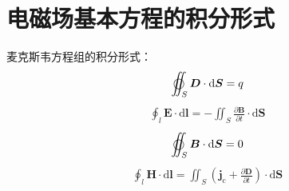 \documentclass[12pt, a4paper, twoside]{ctexbook}
\begin{document}
\section{电磁场基本方程的积分形式}
{\sonti 麦克斯韦方程组的积分形式}：
\begin{eqnarray}
    \varoiint_S\boldsymbol{D}\cdot\mathrm{d}\boldsymbol{S}=q
\end{eqnarray}
\begin{eqnarray}
    \oint_l\boldsymbol{E}\cdot\mathrm{d}\boldsymbol{l}=-\iint_S\frac{\partial \boldsymbol{B}}{\partial t}\cdot\mathrm{d}\boldsymbol{S}
\end{eqnarray}
\begin{eqnarray}
    \varoiint_S\boldsymbol{B}\cdot\mathrm{d}\boldsymbol{S}=0
\end{eqnarray}
\begin{eqnarray}
    \oint_l \boldsymbol{H}\cdot\mathrm{d}\boldsymbol{l}=\iint_S\left(\boldsymbol{j}_\mathrm{c}+\frac{\partial \boldsymbol{D}}{\partial t}\right)\cdot\mathrm{d}\boldsymbol{S}
\end{eqnarray}
\end{document}
